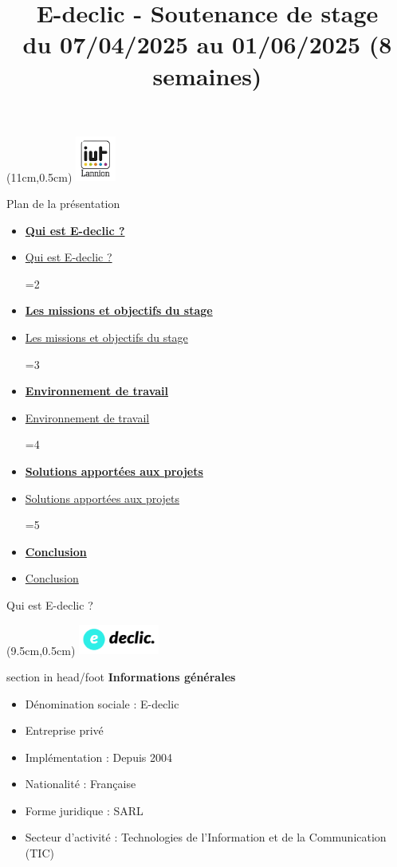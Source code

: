 \documentclass{beamer}
\title[IUT Lannion -- Soutenance Stage]{E-declic - Soutenance de stage \\ \normalsize du 07/04/2025 au 01/06/2025 (8 semaines)}
\author{\NomPrenom}
\institute{IUT de Lannion -- Département Informatique}
\date{\DateSoutenance}
\newcommand{\logoEdeclic}{
	\begin{textblock*}{2cm}(9.5cm,0.5cm)
  		\includegraphics[height=1cm]{../img/logo_e-declic.png}
	\end{textblock*}
}
\newcommand{\planLine}[4]{
  \ifnum#1=#2
    \item \hyperlink{#3}{\textbf{\large #4}}
  \else
    \item \hyperlink{#3}{#4}
  \fi
}
\newcommand{\planSlide}[1]{
  	\begin{frame}{Plan de la présentation}
  		\begin{center}
  			\begin{minipage}{1\textwidth}
				\begin{itemize}
      			\planLine{#1}{1}{organisation}{Qui est E-declic ?}
      			\planLine{#1}{2}{sujet}{Les missions et objectifs du stage}
      			\planLine{#1}{3}{environnement}{Environnement de travail}
      			\planLine{#1}{4}{realisation}{Solutions apportées aux projets}
      			\planLine{#1}{5}{conclusion}{Conclusion}
	    		\end{itemize}
  		\end{minipage}
	\end{center}
	\vfill
	\end{frame}
}
\begin{document}
\begin{frame}[plain]
	\begin{minipage}[t]{0.75\textwidth}
    		\titlepage
  	\end{minipage}
	\begin{textblock*}{2cm}(11cm,0.5cm)
    		\includegraphics[height=1.5cm]{../img/logo_iut.png}
	\end{textblock*}
\end{frame}

\planSlide{1}

\begin{frame}[label=organisation]{Qui est E-declic ?}
	\logoEdeclic

	\begin{beamercolorbox}[wd=\paperwidth,ht=1.5em,dp=0.5em,leftskip=0.5cm]{section in head/foot}
  		\large \textbf{Informations générales}
	\end{beamercolorbox}
	\vspace{0.5em}
	\begin{center}
  		\begin{minipage}{0.9\textwidth}
    			\begin{itemize}
      			\item Dénomination sociale : E-declic
      			\item Entreprise privé
      			\item Implémentation : Depuis 2004
				\item Nationalité : Française
      			\item Forme juridique : SARL
      			\item Secteur d'activité : Technologies de l'Information et de la Communication (TIC)
    			\end{itemize}
  		\end{minipage}
	\end{center}
	\vfill
\end{frame}
\end{document}
